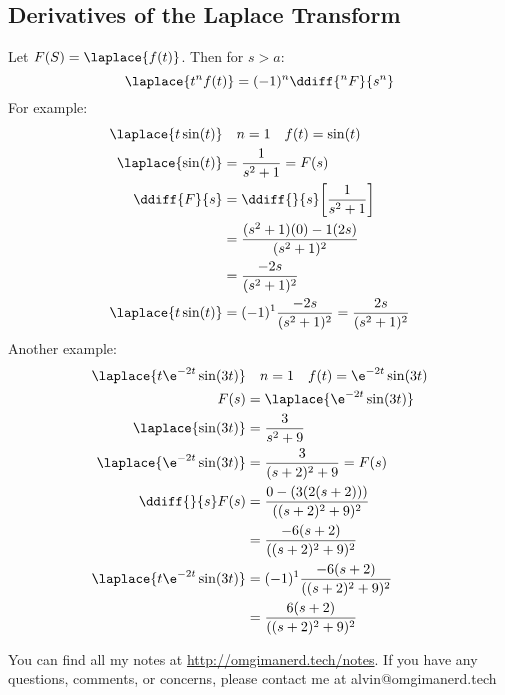 \documentclass{math}
\begin{document}
\subsection*{Derivatives of the Laplace Transform}
Let \( F(S) = \laplace{f(t)} \). Then for \( s>a \):
\[ \laplace{t^nf(t)} = (-1)^n\ddiff{^nF}{s^n} \]
For example:
\begin{align*}
  \laplace{t\sin(t)} & \quad n = 1 \quad f(t) = \sin(t) \\
  \laplace{\sin(t)} &= \frac{1}{s^2+1} = F(s) \\
  \ddiff{F}{s} &= \ddiff{}{s}\bigg[\frac{1}{s^2+1}\bigg] \\
  &= \frac{(s^2+1)(0)-1(2s)}{(s^2+1)^2} \\
  &= \frac{-2s}{(s^2+1)^2} \\
  \laplace{t\sin(t)} &= (-1)^1\frac{-2s}{(s^2+1)^2} = \frac{2s}{(s^2+1)^2}
\end{align*}
Another example:
\begin{align*}
  \laplace{t\e^{-2t}\sin(3t)} & \quad n = 1 \quad f(t) = \e^{-2t}\sin(3t) \\
  F(s) &= \laplace{\e^{-2t}\sin(3t)} \\
  \laplace{\sin(3t)} &= \frac{3}{s^2+9} \\
  \laplace{\e^{-2t}\sin(3t)} &= \frac{3}{(s+2)^2+9} = F(s) \\
  \ddiff{}{s}F(s) &= \frac{0-(3(2(s+2)))}{((s+2)^2+9)^2} \\
  &= \frac{-6(s+2)}{((s+2)^2+9)^2} \\
  \laplace{t\e^{-2t}\sin(3t)} &= (-1)^1\frac{-6(s+2)}{((s+2)^2+9)^2} \\
  &= \frac{6(s+2)}{((s+2)^2+9)^2} \\
\end{align*}

\begin{center}
  You can find all my notes at \url{http://omgimanerd.tech/notes}. If you have
  any questions, comments, or concerns, please contact me at
  alvin@omgimanerd.tech
\end{center}
\end{document}
